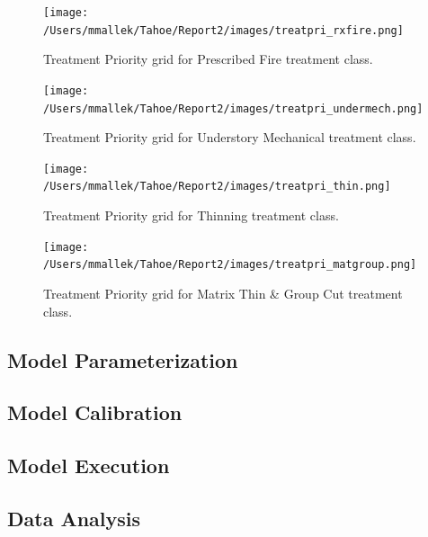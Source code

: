 \begin{figure}
\centering
\texttt{[image: /Users/mmallek/Tahoe/Report2/images/treatpri\_rxfire.png]}
\caption{Treatment Priority grid for Prescribed Fire treatment class.} 
\label{treatpri_rxfire}
\end{figure}

\begin{figure}
\centering
\texttt{[image: /Users/mmallek/Tahoe/Report2/images/treatpri\_undermech.png]}
\caption{Treatment Priority grid for Understory Mechanical treatment class.} 
\label{treatpri_undermech}
\end{figure}

\begin{figure}
\centering
\texttt{[image: /Users/mmallek/Tahoe/Report2/images/treatpri\_thin.png]}
\caption{Treatment Priority grid for Thinning treatment class.} 
\label{treatpri_thin}
\end{figure}

\begin{figure}
\centering
\texttt{[image: /Users/mmallek/Tahoe/Report2/images/treatpri\_matgroup.png]}
\caption{Treatment Priority grid for Matrix Thin \& Group Cut treatment class.} 
\label{treatpri_matgroup}
\end{figure}

\subsection{Model Parameterization}

\subsection{Model Calibration}

\subsection{Model Execution}

\subsection{Data Analysis}



